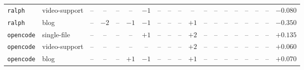 \begin{table}[h]
\begin{tabular}{l l cccccccccccccccc r}
\texttt{ralph}    & video-support & -- & -- & -- & -- & $-1$ & -- & -- & --   & --   & -- & -- & -- & -- & -- & -- & -- & $-0.080$ \\
\texttt{ralph}    & blog    & -- & $-2$ & -- & $-1$ & $-1$ & -- & -- & --   & $+1$ & -- & -- & -- & -- & -- & -- & -- & $-0.350$ \\
\texttt{opencode} & single-file  & -- & -- & -- & -- & $+1$ & -- & -- & --   & $+2$ & -- & -- & -- & -- & -- & -- & -- & $+0.135$ \\
\texttt{opencode} & video-support & -- & -- & -- & -- & --   & -- & -- & --   & $+2$ & -- & -- & -- & -- & -- & -- & -- & $+0.060$ \\
\texttt{opencode} & blog    & -- & -- & -- & $+1$ & $-1$ & -- & -- & --   & $+1$ & -- & -- & -- & -- & -- & -- & -- & $+0.070$ \\
\bottomrule
\end{tabular}
\end{table}

